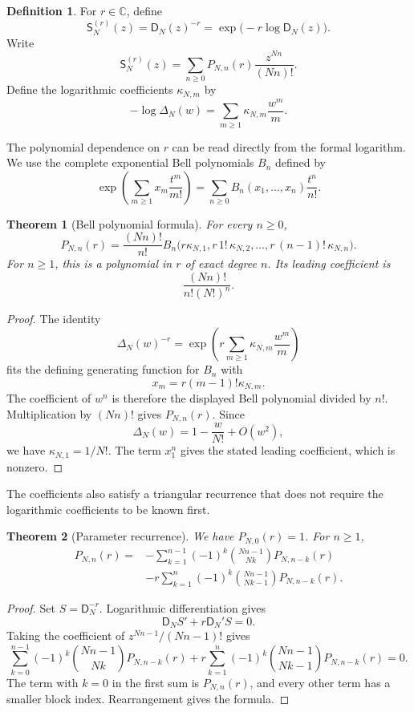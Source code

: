 \documentclass[11pt,letterpaper]{article}
\newtheorem{theorem}{Theorem}[section]
\theoremstyle{definition}
\newtheorem{definition}[definition]{Definition}
\theoremstyle{remark}
\newcommand{\CC}{\mathbb C}
\newcommand{\Dfun}{\mathsf D}
\newcommand{\Sfun}{\mathsf S}
\begin{document}
\begin{definition}\label{def:reciprocal_family}
For $r\in\CC$, define
\[
\Sfun_N^{(r)}(z)
=
\Dfun_N(z)^{-r}
=
\exp\bigl(-r\log\Dfun_N(z)\bigr).
\]
Write
\[
\Sfun_N^{(r)}(z)
=
\sum_{n\geq0}P_{N,n}(r)\frac{z^{Nn}}{(Nn)!}.
\]
Define the logarithmic coefficients $\kappa_{N,m}$ by
\[
-\log\Delta_N(w)
=
\sum_{m\geq1}\kappa_{N,m}\frac{w^m}{m}.
\]
\end{definition}

The polynomial dependence on $r$ can be read directly from the formal logarithm.  We use the complete exponential Bell polynomials $B_n$ defined by
\[
\exp\left(\sum_{m\geq1}x_m\frac{t^m}{m!}\right)
=
\sum_{n\geq0}B_n(x_1,\ldots,x_n)\frac{t^n}{n!}.
\]

\begin{theorem}[Bell polynomial formula]\label{thm:reciprocal_bell}
For every $n\geq0$,
\[
P_{N,n}(r)
=
\frac{(Nn)!}{n!}
B_n\bigl(
 r\kappa_{N,1},
 r\,1!\,\kappa_{N,2},
 \ldots,
 r\,(n-1)!\,\kappa_{N,n}
\bigr).
\]
For $n\geq1$, this is a polynomial in $r$ of exact degree $n$.  Its leading coefficient is
\[
\frac{(Nn)!}{n!(N!)^n}.
\]
\end{theorem}

\begin{proof}
The identity
\[
\Delta_N(w)^{-r}
=
\exp\left(
 r\sum_{m\geq1}\kappa_{N,m}\frac{w^m}{m}
\right)
\]
fits the defining generating function for $B_n$ with
\[
x_m=r(m-1)!\kappa_{N,m}.
\]
The coefficient of $w^n$ is therefore the displayed Bell polynomial divided by $n!$.  Multiplication by $(Nn)!$ gives $P_{N,n}(r)$.  Since
\[
\Delta_N(w)=1-\frac{w}{N!}+O(w^2),
\]
we have $\kappa_{N,1}=1/N!$.  The term $x_1^n$ gives the stated leading coefficient, which is nonzero.
\end{proof}

The coefficients also satisfy a triangular recurrence that does not require the logarithmic coefficients to be known first.

\begin{theorem}[Parameter recurrence]\label{thm:parameter_recurrence}
We have $P_{N,0}(r)=1$.  For $n\geq1$,
\[
\begin{aligned}
P_{N,n}(r)
={}&-
\sum_{k=1}^{n-1}
(-1)^k
\binom{Nn-1}{Nk}
P_{N,n-k}(r)
\\
&-r
\sum_{k=1}^{n}
(-1)^k
\binom{Nn-1}{Nk-1}
P_{N,n-k}(r).
\end{aligned}
\]
\end{theorem}

\begin{proof}
Set $S=\Dfun_N^{-r}$.  Logarithmic differentiation gives
\[
\Dfun_NS'+r\Dfun_N'S=0.
\]
Taking the coefficient of $z^{Nn-1}/(Nn-1)!$ gives
\[
\sum_{k=0}^{n-1}(-1)^k
\binom{Nn-1}{Nk}P_{N,n-k}(r)
+r\sum_{k=1}^{n}(-1)^k
\binom{Nn-1}{Nk-1}P_{N,n-k}(r)=0.
\]
The term with $k=0$ in the first sum is $P_{N,n}(r)$, and every
other term has a smaller block index.  Rearrangement gives the formula.
\end{proof}
\end{document}
